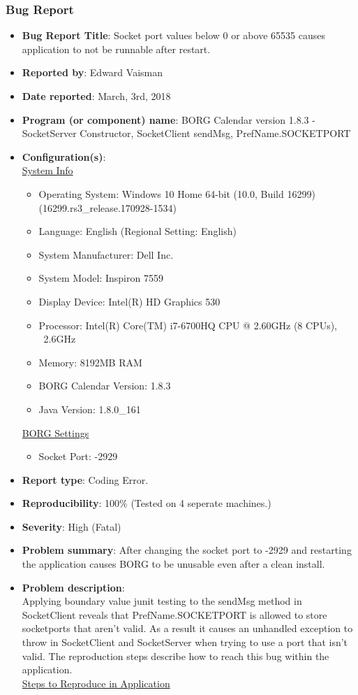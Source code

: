 \documentclass[fontsize=12pt,paper=letter,twoside]{scrartcl}
\begin{document}
\begin{itemize}
\subsubsection{Bug Report}
\begin{itemize}
\item \textbf{Bug Report Title}: Socket port values below 0 or above 65535 causes application to not be runnable after restart.
\item \textbf{Reported by}: Edward Vaisman
\item \textbf{Date reported}: March, 3rd, 2018
\item \textbf{Program (or component) name}: BORG Calendar version 1.8.3 - SocketServer Constructor, SocketClient sendMsg,  PrefName.SOCKETPORT
\item \textbf{Configuration(s)}:\\
\underline{System Info}
\begin{itemize}
\item{Operating System: Windows 10 Home 64-bit (10.0, Build 16299)\\(16299.rs3\_release.170928-1534)}
\item {Language: English (Regional Setting: English)}
\item {System Manufacturer: Dell Inc.}
\item {System Model: Inspiron 7559}
\item {Display Device: Intel(R) HD Graphics 530}
\item {Processor: Intel(R) Core(TM) i7-6700HQ CPU @ 2.60GHz (8 CPUs), ~2.6GHz }
\item {Memory: 8192MB RAM}
\item {BORG Calendar Version: 1.8.3}
\item {Java Version: 1.8.0\_161}
\end{itemize}
\underline{BORG Settings}
\begin{itemize}
\item{Socket Port: -2929}
\end{itemize}
\item \textbf{Report type}: Coding Error.
\item \textbf{Reproducibility}: 100\% (Tested on 4 seperate machines.)
\item \textbf{Severity}: High (Fatal)
\item \textbf{Problem summary}: After changing the socket port to -2929 and restarting the application causes BORG to be unusable even after a clean install.
\item \textbf{Problem description}:\\
Applying boundary value junit testing to the sendMsg method in SocketClient reveals that PrefName.SOCKETPORT is allowed to store socketports that aren't valid. As a result it causes an unhandled exception to throw in SocketClient and SocketServer when trying to use a port that isn't valid. The reproduction steps describe how to reach this bug within the application. \\
\underline{Steps to Reproduce in Application}
\begin{enumerate}


\end{enumerate}
\end{itemize}
\end{itemize}
\end{document}
